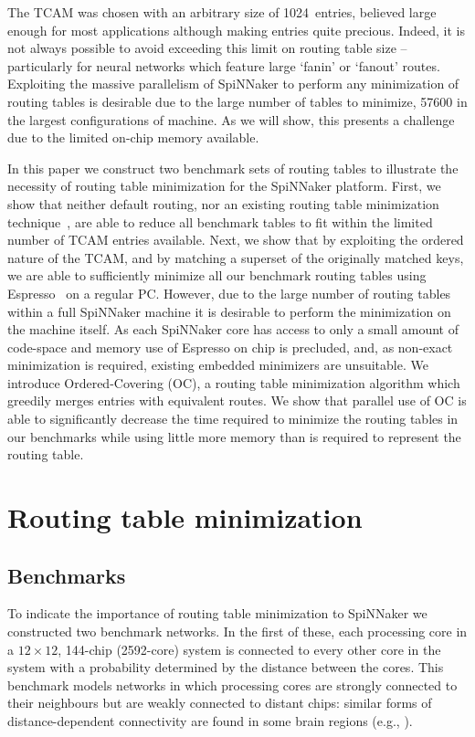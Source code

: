 \documentclass[conference]{IEEEtran}
\begin{document}
The TCAM was chosen with an arbitrary size of \num{1024}~entries, believed large enough for most applications although making entries quite precious.
Indeed, it is not always possible to avoid exceeding this limit on routing table size -- particularly for neural networks which feature large `fanin' or `fanout' routes.
Exploiting the massive parallelism of SpiNNaker to perform any minimization of routing tables is desirable due to the large number of tables to minimize, \num{57600} in the largest configurations of machine.
As we will show, this presents a challenge due to the limited on-chip memory available.

In this paper we construct two benchmark sets of routing tables to illustrate the necessity of routing table minimization for the SpiNNaker platform.
First, we show that neither default routing, nor an existing routing table minimization technique~\parencite{Liu2002}, are able to reduce all benchmark tables to fit within the limited number of TCAM entries available.
Next, we show that by exploiting the ordered nature of the TCAM, and by matching a superset of the originally matched keys, we are able to sufficiently minimize all our benchmark routing tables using Espresso~\parencite{Brayton1984} on a regular PC.
However, due to the large number of routing tables within a full SpiNNaker machine it is desirable to perform the minimization on the machine itself.
As each SpiNNaker core has access to only a small amount of code-space and memory use of Espresso on chip is precluded, and, as non-exact minimization is required, existing embedded minimizers are unsuitable.
We introduce Ordered-Covering (OC), a routing table minimization algorithm which greedily merges entries with equivalent routes.
We show that parallel use of OC is able to significantly decrease the time required to minimize the routing tables in our benchmarks while using little more memory than is required to represent the routing table.

\section{Routing table minimization}

\subsection{Benchmarks}

To indicate the importance of routing table minimization to SpiNNaker we constructed two benchmark networks.
In the first of these, each processing core in a $12\times12$, 144-chip (\num{2592}-core) system is connected to every other core in the system with a probability determined by the distance between the cores.
This benchmark models networks in which processing cores are strongly connected to their neighbours but are weakly connected to distant chips:
similar forms of distance-dependent connectivity are found in some brain regions (e.g., \parencite{Hellwig2000}).
\end{document}
